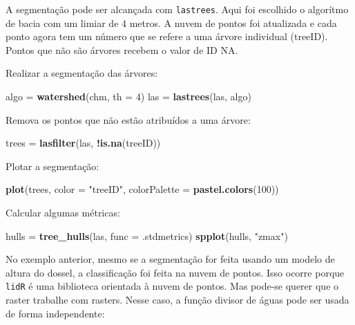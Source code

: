 \documentclass[
]{book}
\newenvironment{Shaded}{\begin{snugshade}}{\end{snugshade}}
\newcommand{\DataTypeTok}[1]{\textcolor[rgb]{0.13,0.29,0.53}{#1}}
\newcommand{\DecValTok}[1]{\textcolor[rgb]{0.00,0.00,0.81}{#1}}
\newcommand{\KeywordTok}[1]{\textcolor[rgb]{0.13,0.29,0.53}{\textbf{#1}}}
\newcommand{\NormalTok}[1]{#1}
\newcommand{\OperatorTok}[1]{\textcolor[rgb]{0.81,0.36,0.00}{\textbf{#1}}}
\newcommand{\StringTok}[1]{\textcolor[rgb]{0.31,0.60,0.02}{#1}}
\begin{document}
A segmentação pode ser alcançada com \texttt{lastrees}. Aqui foi escolhido o algorítmo de bacia com um limiar de 4 metros. A nuvem de pontos foi atualizada e cada ponto agora tem um número que se refere a uma árvore individual (treeID). Pontos que não são árvores recebem o valor de ID NA.

Realizar a segmentação das árvores:

\begin{Shaded}
\begin{Highlighting}[]
\NormalTok{algo =}\StringTok{ }\KeywordTok{watershed}\NormalTok{(chm, }\DataTypeTok{th =} \DecValTok{4}\NormalTok{)}
\NormalTok{las  =}\StringTok{ }\KeywordTok{lastrees}\NormalTok{(las, algo)}
\end{Highlighting}
\end{Shaded}

Remova os pontos que não estão atribuídos a uma árvore:

\begin{Shaded}
\begin{Highlighting}[]
\NormalTok{trees =}\StringTok{ }\KeywordTok{lasfilter}\NormalTok{(las, }\OperatorTok{!}\KeywordTok{is.na}\NormalTok{(treeID))}
\end{Highlighting}
\end{Shaded}

Plotar a segmentação:

\begin{Shaded}
\begin{Highlighting}[]
\KeywordTok{plot}\NormalTok{(trees, }\DataTypeTok{color =} \StringTok{"treeID"}\NormalTok{, }\DataTypeTok{colorPalette =} \KeywordTok{pastel.colors}\NormalTok{(}\DecValTok{100}\NormalTok{))}
\end{Highlighting}
\end{Shaded}

Calcular algumas métricas:

\begin{Shaded}
\begin{Highlighting}[]
\NormalTok{hulls  =}\StringTok{ }\KeywordTok{tree_hulls}\NormalTok{(las, }\DataTypeTok{func =}\NormalTok{ .stdmetrics)}
\KeywordTok{spplot}\NormalTok{(hulls, }\StringTok{"zmax"}\NormalTok{)}
\end{Highlighting}
\end{Shaded}

No exemplo anterior, mesmo se a segmentação for feita usando um modelo de altura do dossel, a classificação foi feita na nuvem de pontos. Isso ocorre porque \texttt{lidR} é uma biblioteca orientada à nuvem de pontos. Mas pode-se querer que o raster trabalhe com rasters. Nesse caso, a função divisor de águas pode ser usada de forma independente:
\end{document}

